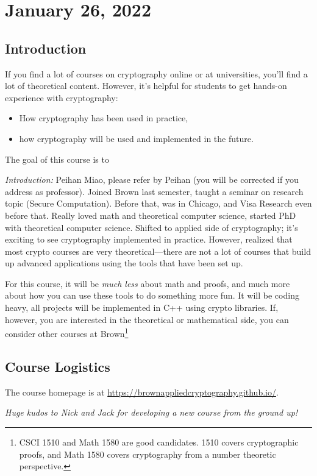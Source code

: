 \section{January 26, 2022}

\subsection{Introduction}
If you find a lot of courses on cryptography online or at universities, you'll find a lot of theoretical content. However, it's helpful for students to get hands-on experience with cryptography:
\begin{itemize}
    \item How cryptography has been used in practice,
    \item how cryptography will be used and implemented in the future.
\end{itemize}

The goal of this course is to

\emph{Introduction:} Peihan Miao, please refer by Peihan (you will be corrected if you address as professor). Joined Brown last semester, taught a seminar on research topic (Secure Computation). Before that, was in Chicago, and Visa Research even before that. Really loved math and theoretical computer science, started PhD with theoretical computer science. Shifted to applied side of cryptography; it's exciting to see cryptography implemented in practice. However, realized that most crypto courses are very theoretical---there are not a lot of courses that build up advanced applications using the tools that have been set up.

For this course, it will be \emph{much less} about math and proofs, and much more about how you can use these tools to do something more fun. It will be coding heavy, all projects will be implemented in C++ using crypto libraries. If, however, you are interested in the theoretical or mathematical side, you can consider other courses at Brown\footnote{CSCI 1510 and Math 1580 are good candidates. 1510 covers cryptographic proofs, and Math 1580 covers cryptography from a number theoretic perspective.}

\subsection{Course Logistics}
The course homepage is at \url{https://brownappliedcryptography.github.io/}.

\emph{Huge kudos to Nick and Jack for developing a new course from the ground up!}

